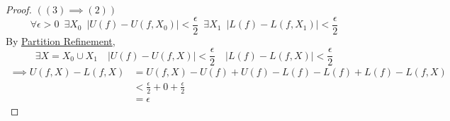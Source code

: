 \documentclass[11pt, oneside]{book}
\theoremstyle{break}
\newtheorem*{proof}{Proof}
\begin{document}
\begin{proof}
	$((3) \implies (2))$ \\
	\begin{equation*}
		\forall \epsilon > 0 \enspace \exists X_0 \enspace |U(f) - U(f, X_0)| < \frac{\epsilon}{2} \enspace \exists X_1 \enspace |L(f) - L(f, X_1)| < \frac{\epsilon}{2} 
	\end{equation*}
	By \hyperref[partition_refinement]{Partition Refinement},
	\begin{equation*}
		\exists X = X_0 \cup X_1 \quad |U(f) - U(f, X)| < \frac{\epsilon}{2} \quad |L(f) - L(f, X)| < \frac{\epsilon}{2}
	\end{equation*}
	\begin{align*}
		\implies U(f, X) - L(f, X) &= U(f, X) - U(f) + U(f) - L(f) - L(f) + L(f) - L(f, X) \\
								   &< \frac{\epsilon}{2} + 0 + \frac{\epsilon}{2} \\
								   &= \epsilon
	\end{align*}


\end{proof}
\end{document}

